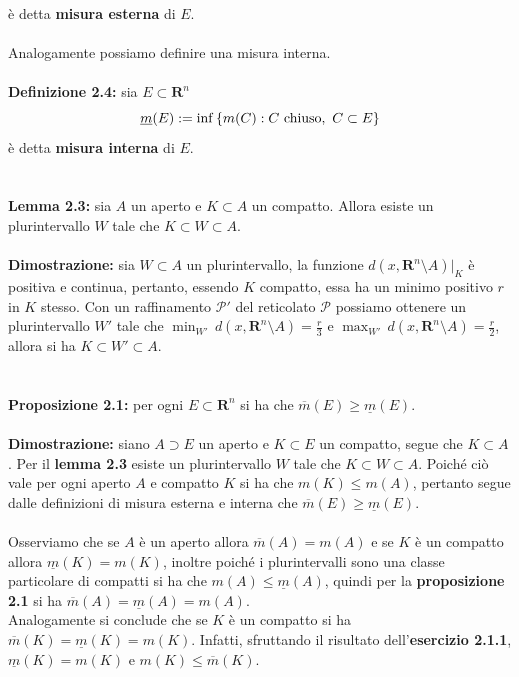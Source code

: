 \documentclass{article}
\begin{document}
è detta \textbf{misura esterna} di $E$. \\ \\
Analogamente possiamo definire una misura interna. \\ \\
\textbf{Definizione 2.4:} sia $E \subset \mathbf{R}^n$
\begin{equation}
    \underline{m}(E) := \inf\left\{ m(C) : C \text{ chiuso}, \ C \subset E \right\} \notag
\end{equation}
è detta \textbf{misura interna} di $E$. \\ \\ \\
\textbf{Lemma 2.3:} sia $A$ un aperto e $K \subset A$ un compatto. Allora esiste un plurintervallo $W$ tale che $K \subset W \subset A$. \\ \\
\textbf{Dimostrazione:} sia $W \subset A$ un plurintervallo, la funzione $d(x, \mathbf{R}^n \setminus A)|_K$ è positiva e continua, pertanto, essendo $K$ compatto, essa ha un minimo positivo $r$ in $K$ stesso. Con un raffinamento $\mathcal{P}'$ del reticolato $\mathcal{P}$ possiamo ottenere un plurintervallo $W'$ tale che $\min_{W'} \, d(x, \mathbf{R}^n \setminus A) = \frac{r}{3}$ e $\max_{W'} \, d(x, \mathbf{R}^n \setminus A) = \frac{r}{2}$, allora si ha $K \subset W' \subset A$. \\ \\ \\
\textbf{Proposizione 2.1:} per ogni $E \subset \mathbf{R}^n$ si ha che $\overline{m}(E) \geq \underline{m}(E)$. \\ \\
\textbf{Dimostrazione:} siano $A \supset E$ un aperto e $K \subset E$ un compatto, segue che $K \subset A$. Per il \textbf{lemma 2.3} esiste un plurintervallo $W$ tale che $K \subset W \subset A$. Poiché ciò vale per ogni aperto $A$ e compatto $K$ si ha che $m(K) \leq m(A)$, pertanto segue dalle definizioni di misura esterna e interna che $\overline{m}(E) \geq \underline{m}(E)$. \\ \\
Osserviamo che se $A$ è un aperto allora $\overline{m}(A) = m(A)$ e se $K$ è un compatto allora $\underline{m}(K) = m(K)$, inoltre poiché i plurintervalli sono una classe particolare di compatti si ha che $m(A) \leq \underline{m}(A)$, quindi per la \textbf{proposizione 2.1} si ha $\overline{m}(A) = \underline{m}(A) = m(A)$. \\
Analogamente si conclude che se $K$ è un compatto si ha $\overline{m}(K) = \underline{m}(K) = m(K)$. Infatti, sfruttando il risultato dell'\textbf{esercizio 2.1.1}, $\underline{m}(K) = m(K)$ e $m(K) \leq \overline{m}(K)$. \\ \\ \\
\end{document}
